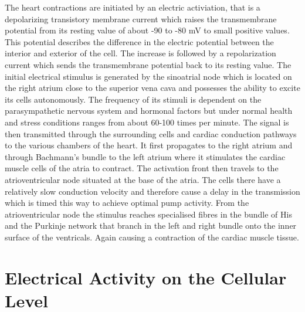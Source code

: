 \documentclass[../draft_1.tex]{subfiles}
\begin{document}
The heart contractions are initiated by an electric activiation, that is a depolarizing transistory membrane current which raises the transmembrane potential from its resting value of about -90 to -80 mV to small positive values. This potential describes the difference in the electric potential between the interior and exterior of the cell. The increase is followed by a repolarization current which sends the transmembrane potential back to its resting value. The initial electrical stimulus is generated by the sinoatrial node which is located on the right atrium close to the superior vena cava and possesses the ability to excite its cells autonomously. The frequency of its stimuli is dependent on the parasympathetic nervous system and hormonal factors but under normal health and stress conditions ranges from about 60-100 times per minute. The signal is then transmitted through the surrounding cells and cardiac conduction pathways to the various chambers of the heart. It first propagates to the right atrium and through Bachmann's bundle to the left atrium where it stimulates the cardiac muscle cells of the atria to contract. The activation front then travels to the atrioventricular node situated at the base of the atria. The cells there have a relatively slow conduction velocity and therefore cause a delay in the transmission which is timed this way to achieve optimal pump activity. From the atrioventricular node the stimulus reaches specialised fibres in the bundle of His and the Purkinje network that branch in the left and right bundle onto the inner surface of the ventricals. Again causing a contraction of the cardiac muscle tissue. 

\section{Electrical Activity on the Cellular Level}
\end{document}
